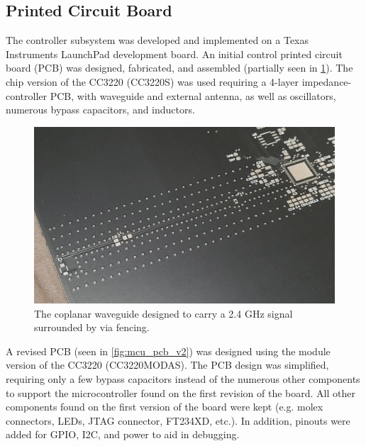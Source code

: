 \documentclass[journal]{IEEEtran}
\begin{document}
\subsection{Printed Circuit Board} The controller subsystem was developed and implemented on a Texas Instruments LaunchPad development board. An initial control printed circuit board (PCB) was designed, fabricated, and assembled (partially seen in \ref{fig:mcu_v1_cpwg}). The chip version of the CC3220 (CC3220S) was used requiring a 4-layer impedance-controller PCB, with waveguide and external antenna, as well as oscillators, numerous bypass capacitors, and inductors.

\begin{figure}[H]
   \centering
   \label{fig:mcu_v1_cpwg}
   \includegraphics[width=\linewidth]{images/mcu_v1_cpwg.jpg}
   \caption{The coplanar waveguide designed to carry a 2.4 GHz signal surrounded by via fencing.}
\end{figure}

A revised PCB (seen in \ref{fig:mcu_pcb_v2}) was designed using the module version of the CC3220 (CC3220MODAS). The PCB design was simplified, requiring only a few bypass capacitors instead of the numerous other components to support the microcontroller found on the first revision of the board. All other components found on the first version of the board were kept (e.g. molex connectors, LEDs, JTAG connector, FT234XD, etc.). In addition, pinouts were added for GPIO, I2C, and power to aid in debugging.
\end{document}
